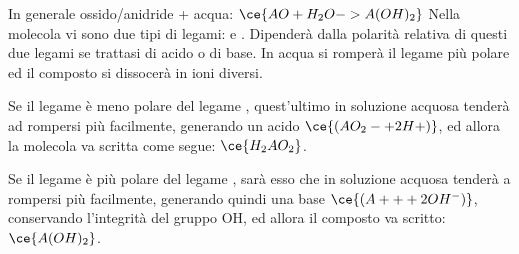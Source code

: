 In generale ossido/anidride + acqua:
\(\ce{AO + H_2O -> A(OH)_2}\)
Nella molecola vi sono due tipi di legami:  e . Dipenderà dalla polarità relativa di questi due legami se trattasi di acido o di base. In acqua si romperà il legame più polare ed il composto si dissocerà in ioni diversi.

Se il legame  è meno polare del legame , quest'ultimo in soluzione acquosa tenderà ad rompersi più facilmente, generando un acido \(\ce{(AO_2- + 2H+)}\), ed allora la molecola va scritta come segue: \(\ce{H_2AO_2}\).

Se il legame  è più polare del legame , sarà esso che in soluzione acquosa tenderà a rompersi più facilmente, generando quindi una base \(\ce{(A++ + 2OH^-)}\), conservando l’integrità del gruppo OH, ed allora il composto va scritto: \(\ce{A(OH)_2}\).
